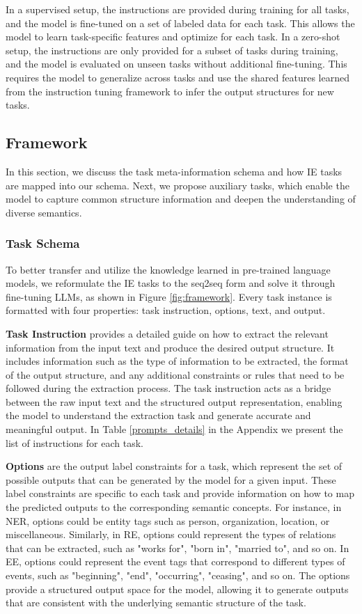 In a supervised setup, the instructions are provided during training for all tasks, and the model is fine-tuned on a set of labeled data for each task. This allows the model to learn task-specific features and optimize for each task. In a zero-shot setup, the instructions are only provided for a subset of tasks during training, and the model is evaluated on unseen tasks without additional fine-tuning. This requires the model to generalize across tasks and use the shared features learned from the instruction tuning framework to infer the output structures for new tasks.

\subsection{Framework}
In this section, we discuss the task meta-information schema and how IE tasks are mapped into our schema. 
Next, we propose auxiliary tasks, which enable the model to capture common structure information and deepen the understanding of diverse semantics.

\subsubsection{Task Schema}\label{task schema}
To better transfer and utilize the knowledge learned in pre-trained language models, we reformulate the IE tasks to the seq2seq form and solve it through fine-tuning LLMs, as shown in Figure \ref{fig:framework}. Every task instance is formatted with four properties: task instruction, options, text, and output.

\textbf{Task Instruction} provides a detailed guide on how to extract the relevant information from the input text and produce the desired output structure. It includes information such as the type of information to be extracted, the format of the output structure, and any additional constraints or rules that need to be followed during the extraction process. The task instruction acts as a bridge between the raw input text and the structured output representation, enabling the model to understand the extraction task and generate accurate and meaningful output. In Table \ref{prompts_details} in the Appendix we present the list of instructions for each task.

\textbf{Options} are the output label constraints for a task, which represent the set of possible outputs that can be generated by the model for a given input. These label constraints are specific to each task and provide information on how to map the predicted outputs to the corresponding semantic concepts. For instance, in NER, options could be entity tags such as person, organization, location, or miscellaneous. Similarly, in RE, options could represent the types of relations that can be extracted, such as "works for", "born in", "married to", and so on. In EE, options could represent the event tags that correspond to different types of events, such as "beginning", "end", "occurring", "ceasing", and so on. The options provide a structured output space for the model, allowing it to generate outputs that are consistent with the underlying semantic structure of the task.

